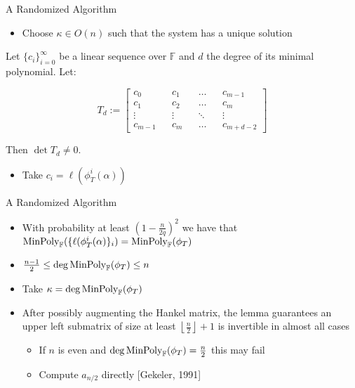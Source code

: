 \documentclass{beamer}
\newcommand{\minpol}{\textnormal{MinPoly}_{\mathbb{F}}}
\begin{document}

\begin{frame}{A Randomized Algorithm}

\begin{itemize}
    \item Choose $\kappa \in O(n)$ such that the system has a unique solution
\end{itemize}

\begin{lemma}\label{kalpan}
Let $\{c_i\}_{i=0}^{\infty}$ be a linear sequence over $\mathbb{F}$ and $d$ the degree of its minimal polynomial. Let:

\[T_d := \begin{bmatrix} c_0 && c_1 && \ldots && c_{m-1} \\ c_1 && c_2 && \ldots && c_{m} \\ \vdots && \vdots && \ddots && \vdots \\ c_{m-1} && c_{m} && \ldots && c_{m + d - 2}  \end{bmatrix}\]

Then $\det T_d \neq 0$.
\end{lemma}

\begin{itemize}
    \item Take $c_i = \ell(\phi_T^i(\alpha))$
\end{itemize}
    
\end{frame}



\begin{frame}{A Randomized Algorithm}

\begin{itemize}
    \item  With probability at least $(1 - \frac{n}{2q})^2$ we have that $\minpol(\{\ell(\phi_T^i(\alpha)\}_i) = \minpol(\phi_T)$
    \item $\frac{n-1}{2} \leq \deg \minpol(\phi_T) \leq n$
    \item Take $\kappa = \deg \minpol(\phi_T)$
    \item After possibly augmenting the Hankel matrix, the lemma guarantees an upper left submatrix of size at least $\left\lfloor \frac{n}{2} \right\rfloor + 1$ is invertible in almost all cases
    \begin{itemize}
        \item If $n$ is even and $\deg \minpol(\phi_T) = \frac{n}{2}$ this may fail
        \item Compute $a_{n/2}$ directly [Gekeler, 1991]
    \end{itemize}
\end{itemize}
    
\end{frame}
\end{document}
